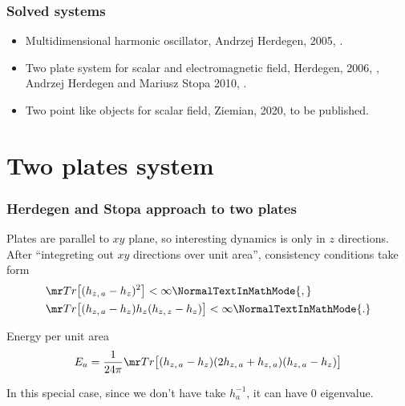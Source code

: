 \documentclass[10pt,t]{beamer}
\begin{document}
\begin{frame}
  \frametitle{Solved systems}


  \begin{itemize}

  \item Multidimensional harmonic oscillator, Andrzej Herdegen, 2005,
    \cite{HerdegenQuantumBackreationPartI2005}.

  \item Two plate system for scalar and electromagnetic field,
    Herdegen, 2006, \cite{HerdegenQuantumBackreactionPartII2006},
    Andrzej Herdegen and Mariusz Stopa 2010,
    \cite{HerdegenStopaGlobalVsLocal2010}.

  \item Two point like objects for scalar field, Ziemian, 2020, to be
    published.

  \end{itemize}

\end{frame}










\section{Two plates system}



\begin{frame}
  \frametitle{Herdegen and Stopa approach to two plates
    \cite{HerdegenStopaGlobalVsLocal2010}}


  Plates are parallel to $xy$ plane, so interesting dynamics is only
  in $z$ directions. After ``integreting out $xy$ directions over unit
  area'', consistency conditions take form
  \begin{subequations}
    \begin{align}
      \label{eq:Herdegens-approach-19-A}
      &\Tr \big[ ( h_{ z,\, a } - h_{ z } )^{ 2 } \big]
        < \infty\NormalTextInMathMode{,} \\
      \label{eq:Herdegens-approach-19-B}
      &\Tr \big[ ( h_{ z,\, a } - h_{ z } ) h_{ z } ( h_{ z,\, z }
        - h_{ z } ) \big] < \infty\NormalTextInMathMode{.}
    \end{align}
  \end{subequations}

  Energy per unit area
  \begin{equation}
    \label{eq:Herdegens-approach-20}
    E_{ a } =
    \frac{ 1 }{ 24 \pi }
    \Tr \big[ ( h_{ z,\, a } - h_{ z } )
    ( 2 h_{ z,\, a } + h_{ z,\, a } ) ( h_{ z,\, a } - h_{ z } ) \big]
  \end{equation}

  In this special case, since we don't have take $h_{ a }^{ -1 }$, it
  can have $0$ eigenvalue.

\end{frame}
\end{document}
